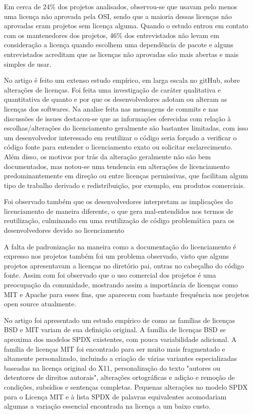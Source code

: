 Em cerca de 24\% dos projetos analisados, observou-se que usavam pelo menos uma licença não aprovada pela OSI, sendo que a maioria dessas licenças não aprovadas eram projetos sem licença alguma. Quando o estudo entrou em contato com os mantenedores dos projetos, 46\% dos entrevistados não levam em consideração a licença quando escolhem uma dependência de pacote e alguns entrevistados acreditam que as licenças não aprovadas são mais abertas e mais simples de usar.

No artigo \cite{Vendome:2017:LUC:3106879.3106907} é feito um extenso estudo empírico, em larga escala no gitHub, sobre alterações de licenças. Foi feita uma investigação de caráter qualitativa e quantitativa de quanto e por que os desenvolvedores adotam ou alteram as licenças dos softwares. Na analise feita nas mensagens de commits e nas discussões de issues destacou-se que as informações oferecidas com relação à escolhas/alterações do licenciamento geralmente são bastantes limitadas, com isso um desenvolvedor interessado em reutilizar o código seria forçado a verificar o código fonte para entender o licenciamento exato ou solicitar esclarecimento. Além disso, os motivos por trás da alteração geralmente não são bem documentados, mas notou-se uma tendencia em alterações de licenciamento predominantemente em direção ou entre licenças permissivas, que facilitam algum tipo de trabalho derivado e redistribuição, por exemplo, em produtos comerciais.

Foi observado também que os desenvolvedores interpretam as implicações do licenciamento de maneira diferente, o que gera mal-entendidos nos termos de reutilização, culminando em uma reutilização de código problemática para os desenvolvedores devido ao licenciamento

A falta de padronização na maneira como a documentação do licenciamento é expresso nos projetos também foi um problema observado, visto que alguns projetos apresentavam a licenças no diretório pai, outras no cabeçalho do código fonte. Assim com foi observado que o uso comercial dos projetos é uma preocupação da comunidade, mostrando assim a importância de licenças como MIT e Apache para esses fins, que aparecem com bastante frequência nos projetos open source atualmente.

No artigo \cite{BSDeMIT} foi apresentado um estudo empírico de como as famílias de licenças BSD e MIT variam de sua definição original. A família de licenças BSD se aproxima dos modelos SPDX existentes, com pouca variabilidade adicional. A família de licenças MIT foi encontrado para ser muito mais fragmentado e altamente personalizado, incluindo a criação de várias variantes especializadas baseadas na licença original do X11, personalização do texto "autores ou detentores de direitos autorais", alterações ortográficas e adição e remoção de condições, subsídios e sentenças completas. Pequenas alterações no modelo SPDX para o Licença MIT e à lista SPDX de palavras equivalentes acomodariam algumas a variação essencial encontrada na licença a um baixo custo.

